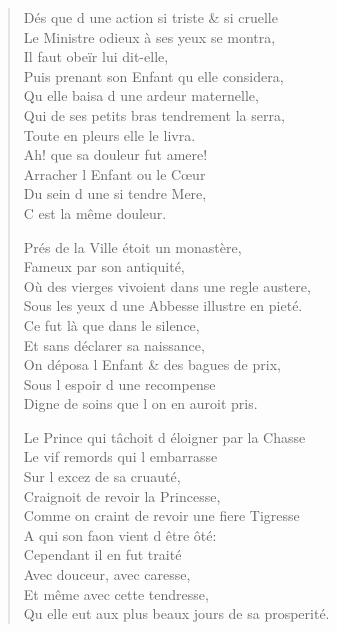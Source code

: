 \begin{verse}
Dés que d\textquotesingle{} une action si triste \& si cruelle \\
Le Ministre odieux à ses yeux se montra, \\
\vin Il faut obeïr lui dit-elle, \\
Puis prenant son Enfant qu\textquotesingle{} elle considera, \\
\vin Qu\textquotesingle{} elle baisa d\textquotesingle{} une ardeur maternelle, \\
Qui de ses petits bras tendrement la serra, \\
\vin Toute en pleurs elle le livra. \\
\vin Ah! que sa douleur fut amere! \\
\vin Arracher l\textquotesingle{} Enfant ou le Cœur \\
\vin Du sein d\textquotesingle{} une si tendre Mere, \\
\vin\vin C\textquotesingle{} est la même douleur.

\vin Prés de la Ville étoit un monastère, \\
\vin Fameux par son antiquité, \\
Où des vierges vivoient dans une regle austere, \\
Sous les yeux d\textquotesingle{} une Abbesse illustre en pieté. \\
\vin Ce fut là que dans le silence, \\
\vin Et sans déclarer sa naissance, \\
On déposa l\textquotesingle{} Enfant \& des bagues de prix, \\
\vin Sous l\textquotesingle{} espoir d\textquotesingle{} une recompense \\
\vin Digne de soins que l\textquotesingle{} on en auroit pris.

Le Prince qui tâchoit d\textquotesingle{} éloigner par la Chasse \\
\vin Le vif remords qui l\textquotesingle{} embarrasse \\
\vin Sur l\textquotesingle{} excez de sa cruauté, \\
\vin Craignoit de revoir la Princesse, \\
Comme on craint de revoir une fiere Tigresse \\
\vin A qui son faon vient d\textquotesingle{} être ôté: \\
\vin Cependant il en fut traité \\
\vin Avec douceur, avec caresse, \\
\vin Et même avec cette tendresse, \\
Qu\textquotesingle{} elle eut aux plus beaux jours de sa prosperité.


\end{verse}
